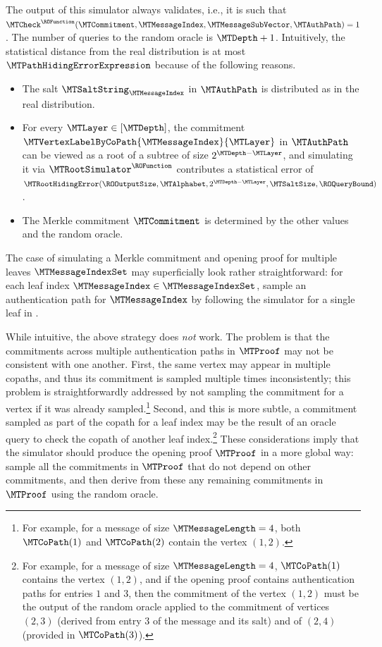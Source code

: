The output of this simulator always validates, i.e., it is such that $\MTCheck^{\ROFunction}(\MTCommitment,\MTMessageIndex,\MTMessageSubVector,\MTAuthPath)=1$. The number of queries to the random oracle is $\MTDepth+1$. Intuitively, the statistical distance from the real distribution is at most $\MTPathHidingErrorExpression$ because of the following reasons.
\begin{itemize}[noitemsep]
  \item The salt $\MTSaltString_{\MTMessageIndex}$ in $\MTAuthPath$ is distributed as in the real distribution.
  \item For every $\MTLayer \in [\MTDepth]$, the commitment $\MTVertexLabelByCoPath{\MTMessageIndex}{\MTLayer}$ in $\MTAuthPath$ can be viewed as a root of a subtree of size $2^{\MTDepth-\MTLayer}$, and simulating it via $\MTRootSimulator^{\ROFunction}$ contributes a statistical error of $\MTRootHidingError(\ROOutputSize,\MTAlphabet,2^{\MTDepth-\MTLayer},\MTSaltSize,\ROQueryBound)$.
  \item The Merkle commitment $\MTCommitment$ is determined by the other values and the random oracle.
\end{itemize}

The case of simulating a Merkle commitment and opening proof for multiple leaves $\MTMessageIndexSet$ may superficially look rather straightforward: for each leaf index $\MTMessageIndex \in \MTMessageIndexSet$, sample an authentication path for $\MTMessageIndex$ by following the simulator for a single leaf in .

While intuitive, the above strategy does \emph{not} work. The problem is that the commitments across multiple authentication paths in $\MTProof$ may not be consistent with one another. First, the same vertex may appear in multiple copaths, and thus its commitment is sampled multiple times inconsistently; this problem is straightforwardly addressed by not sampling the commitment for a vertex if it was already sampled.\footnote{For example, for a message of size $\MTMessageLength=4$, both $\MTCoPath(1)$ and $\MTCoPath(2)$ contain the vertex $(1,2)$.} Second, and this is more subtle, a commitment sampled as part of the copath for a leaf index may be the result of an oracle query to check the copath of another leaf index.\footnote{For example, for a message of size $\MTMessageLength=4$, $\MTCoPath(1)$ contains the vertex $(1,2)$, and if the opening proof contains authentication paths for entries $1$ and $3$, then the commitment of the vertex $(1,2)$ must be the output of the random oracle applied to the commitment of vertices $(2,3)$ (derived from entry $3$ of the message and its salt) and of $(2,4)$ (provided in $\MTCoPath(3)$).} These considerations imply that the simulator should produce the opening proof $\MTProof$ in a more global way: sample all the commitments in $\MTProof$ that do not depend on other commitments, and then derive from these any remaining commitments in $\MTProof$ using the random oracle.

